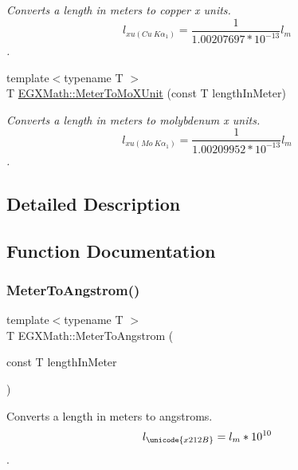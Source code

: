 \begin{DoxyCompactItemize}
\begin{DoxyCompactList}\small\item\em Converts a length in meters to copper x units. \[ l_{xu(Cu\ K\alpha_1)}= \frac{1}{1.00207697*10^{-13}} l_{m} \]. \end{DoxyCompactList}\item 
{\footnotesize template$<$typename T $>$ }\\T \mbox{\hyperlink{group___e_g_x_math-_conversions-_length_conversions-_s_i-_meter-_non-_s_i_gae0351200a3d90c4efe741c6057b2fd4b}{E\+G\+X\+Math\+::\+Meter\+To\+Mo\+X\+Unit}} (const T length\+In\+Meter)
\begin{DoxyCompactList}\small\item\em Converts a length in meters to molybdenum x units. \[ l_{xu(Mo\ K\alpha_1)}=\frac{1}{1.00209952*10^{-13}} l_{m} \]. \end{DoxyCompactList}\end{DoxyCompactItemize}


\subsection{Detailed Description}


\subsection{Function Documentation}
\mbox{\label{group___e_g_x_math-_conversions-_length_conversions-_s_i-_meter-_non-_s_i_ga9e6d5040f58d167bd7a4b6cebb5527ee}} 
\subsubsection{\texorpdfstring{Meter\+To\+Angstrom()}{MeterToAngstrom()}}
{\footnotesize\ttfamily template$<$typename T $>$ \\
T E\+G\+X\+Math\+::\+Meter\+To\+Angstrom (\begin{DoxyParamCaption}\item[{const T}]{length\+In\+Meter }\end{DoxyParamCaption})}



Converts a length in meters to angstroms. \[ l_{\unicode{x212B}}=l_{m} * 10^{10} \]. 

